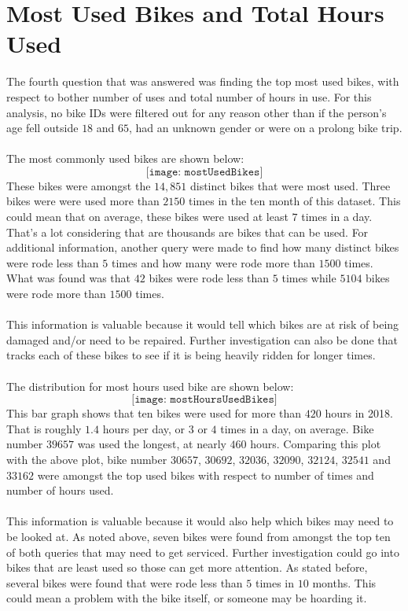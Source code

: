 \documentclass{article}
\begin{document}
\section{Most Used Bikes and Total Hours Used}
The fourth question that was answered was finding the top most used bikes, with respect to bother number of uses and total number of hours in use. For this analysis, no bike IDs were filtered out for any reason other than if the person's age fell outside $18$ and $65$, had an unknown gender or were on a prolong bike trip. \\~\\
The most commonly used bikes are shown below: 
$$ \texttt{[image: mostUsedBikes]} $$ 
These bikes were amongst the $14,851$ distinct bikes that were most used. Three bikes were were used more than $2150$ times in the ten month of this dataset. This could mean that on average, these bikes were used at least $7$ times in a day. That's a lot considering that are thousands are bikes that can be used. For additional information, another query were made to find how many distinct bikes were rode less than $5$ times and how many were rode more than $1500$ times. What was found was that $42$ bikes were rode less than $5$ times while $5104$ bikes were rode more than $1500$ times. \\~\\

This information is valuable because it would tell which bikes are at risk of being damaged and/or need to be repaired. Further investigation can also be done that tracks each of these bikes to see if it is being heavily ridden for longer times. \\~\\
The distribution for most hours used bike are shown below: 
$$ \texttt{[image: mostHoursUsedBikes]} $$ 
This bar graph shows that ten bikes were used for more than $420$ hours in 2018. That is roughly $1.4$ hours per day, or $3$ or $4$ times in a day, on average. Bike number $39657$ was used the longest, at nearly $460$ hours. Comparing this plot with the above plot, bike number $30657$, $30692$, $32036$, $32090$, $32124$, $32541$ and $33162$ were amongst the top used bikes with respect to number of times and number of hours used. 
\\~\\
This information is valuable because it would also help which bikes may need to be looked at. As noted above, seven bikes were found from amongst the top ten of both queries that may need to get serviced. Further investigation could go into bikes that are least used so those can get more attention. As stated before, several bikes were found that were rode less than $5$ times in $10$ months. This could mean a problem with the bike itself, or someone may be hoarding it. 
\newpage
\end{document}
